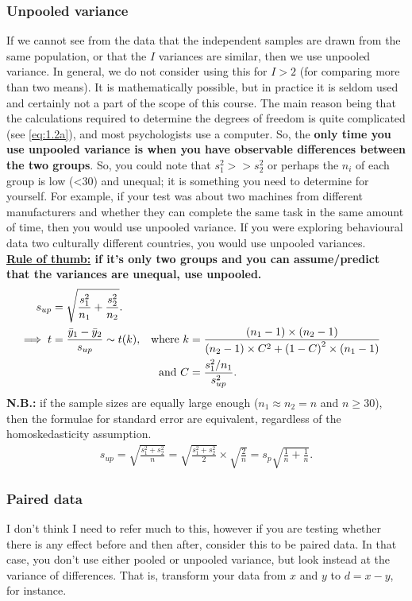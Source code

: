 \subsubsection*{Unpooled variance}
If we cannot see from the data that the independent samples are drawn from the same population, or that the $I$ variances are similar, then we use unpooled variance. In general, we do not consider using this for $I>2$ (for comparing more than two means). It is mathematically possible, but in practice it is seldom used and certainly not a part of the scope of this course. The main reason being that the calculations required to determine the degrees of freedom is quite complicated (see \eqref{eq:1.2a}), and most psychologists use a computer. So, the \textbf{only time you use unpooled variance is when you have observable differences between the two groups}. So, you could note that $s_1^2>>s_2^2$ or perhaps the $n_i$ of each group is low (<30) and unequal; it is something you need to determine for yourself. For example, if your test was about two machines from different manufacturers and whether they can complete the same task in the same amount of time, then you would use unpooled variance. If you were exploring behavioural data two culturally different countries, you would use unpooled variances. \\
\textbf{\underline{Rule of thumb:} if it's only two groups and you can assume/predict that the variances are unequal, use unpooled.}
\begin{align}
    s_{up} &= \sqrt{\frac{s_1^2}{n_1} + \frac{s_2^2}{n_2}}. \label{eq:bisup}\\
    \implies t &= \frac{\Bar{y}_1 - \Bar{y}_2}{s_{up}} \sim t (k), & \text{where } k &= \frac{\left( n_1 - 1\right) \times \left( n_2 - 1\right)}{\left( n_2 - 1\right)\times C^2 + \left( 1-C\right)^2 \times \left( n_1 - 1\right)} \label{eq:1.2a} \\
    && \text{and } C &= \frac{s_1^2/n_1}{s_{up}^2}.
\end{align}
\textbf{N.B.:} if the sample sizes are equally large enough ($n_1 \approx n_2 = n$ and $n\geq 30$), then the formulae for standard error are equivalent, regardless of the homoskedasticity assumption.
\begin{gather}
    s_{up} = \sqrt{\frac{s_1^2 + s_2^2}{n}} = \sqrt{\frac{s_1^2 + s_2^2}{2}} \times \sqrt{\frac{2}{n}} = s_p \sqrt{\frac{1}{n} + \frac{1}{n}}. \label{eq:sepooled}
\end{gather}
\subsubsection*{Paired data}\label{paireddata}
I don't think I need to refer much to this, however if you are testing whether there is any effect before and then after, consider this to be paired data. In that case, you don't use either pooled or unpooled variance, but look instead at the variance of differences. That is, transform your data from $x$ and $y$ to $d = x-y$, for instance.

